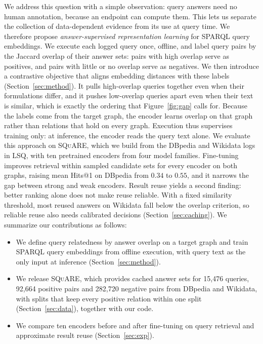 \documentclass[runningheads]{llncs}
\newcommand{\squareds}{\textsc{SQuARE}}
\begin{document}
We address this question with a simple observation: query answers need no
human annotation, because an endpoint can compute them. This lets us
separate the collection of data-dependent evidence from its use at query
time. We therefore propose \emph{answer-supervised representation learning}
for SPARQL query embeddings. We execute each logged query once, offline, and
label query pairs by the Jaccard overlap of their answer sets: pairs with
high overlap serve as positives, and pairs with little or no overlap serve
as negatives.
We then introduce a contrastive objective that aligns embedding distances
with these labels (Section~\ref{sec:method}). It pulls high-overlap queries
together even when their formulations differ, and it pushes low-overlap
queries apart even when their text is similar, which is exactly the ordering
that Figure~\ref{fig:gap} calls for. Because the labels come from the target
graph, the encoder learns overlap on that graph rather than relations that
hold on every graph. Execution thus supervises training only: at inference,
the encoder reads the query text alone.
We evaluate this approach on \squareds{}, which we build from the DBpedia
and Wikidata logs in LSQ, with ten pretrained encoders from four model
families. Fine-tuning improves retrieval within sampled candidate sets for
every encoder on both graphs, raising mean Hits@1 on DBpedia from $0.34$ to
$0.55$, and it narrows the gap between strong and weak encoders. Result
reuse yields a second finding: better ranking alone does not make reuse
reliable. With a fixed similarity threshold, most reused answers on Wikidata
fall below the overlap criterion, so reliable reuse also needs calibrated
decisions (Section~\ref{sec:caching}). We summarize our contributions as follows:
\begin{itemize}
  \item We define query relatedness by answer
        overlap on a target graph and train SPARQL query embeddings from
        offline execution, with query text as the only input at inference
        (Section~\ref{sec:method}).
  \item We release \squareds{}, which provides cached
        answer sets for 15{,}476 queries, 92{,}664 positive pairs and
        282{,}720 negative pairs from DBpedia and Wikidata, with splits that
        keep every positive relation within one split
        (Section~\ref{sec:data}), together with our code.
  \item We compare ten encoders before and after
        fine-tuning on query retrieval and approximate result reuse
        (Section~\ref{sec:exp}).
\end{itemize}
\end{document}
